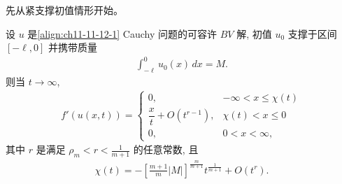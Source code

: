 \documentclass[../../main.tex]{subfiles}
\begin{document}
先从紧支撑初值情形开始。

\begin{theorem}\label{theorem:ch11-11-12-4}
设 $u$ 是\eqref{align:ch11-11-12-1} Cauchy 问题的可容许 $BV$ 解, 初值 $u_0$ 支撑于区间 $[-\ell,0]$ 并携带质量
\begin{align}
\int_{-\ell}^0 u_0(x)\,dx=M.\label{align:ch11-11-12-27}
\end{align}
则当 $t\to\infty$,
\begin{align}
f'(u(x,t))=
\begin{cases}
0, & -\infty<x\leqslant\chi(t)\\
\dfrac{x}{t}+O(t^{r-1}), & \chi(t)<x\leqslant0\\
0, & 0<x<\infty,
\end{cases}\label{align:ch11-11-12-28}
\end{align}
其中 $r$ 是满足 $\rho_m<r<\frac{1}{m+1}$ 的任意常数, 且
\begin{align}
\chi(t)=-\left[\frac{m+1}{m}|M|\right]^{\frac{m}{m+1}}t^{\frac{1}{m+1}}+O(t^r).\label{align:ch11-11-12-29}
\end{align}
\end{theorem}
\end{document}
